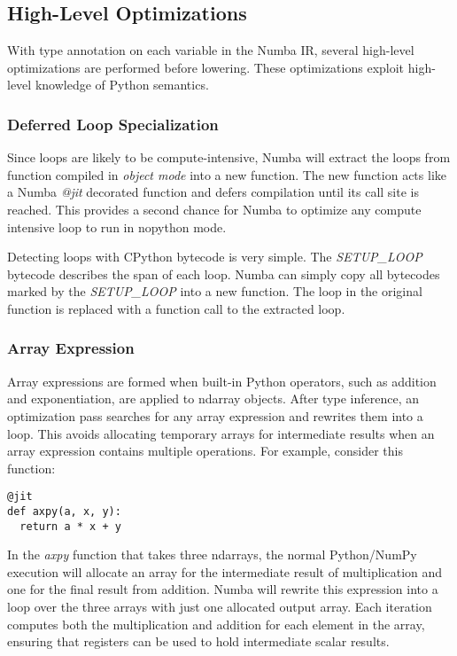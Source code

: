 \documentclass{sig-alternate}
\begin{document}
\subsection{High-Level Optimizations}

With type annotation on each variable in the Numba IR, several high-level
optimizations are performed before lowering. These optimizations exploit
high-level knowledge of Python semantics.

\subsubsection{Deferred Loop Specialization}

Since loops are likely to be compute-intensive, Numba will extract the
loops from function compiled in \textit{object mode} into a new
function.  The new function acts like a Numba \textit{@jit} decorated
function and defers compilation until its call site is reached. This
provides a second chance for Numba to optimize any compute intensive
loop to run in nopython mode.

Detecting loops with CPython bytecode is very simple. The
\textit{SETUP\_LOOP} bytecode describes the span of each loop. Numba
can simply copy all bytecodes marked by the \textit{SETUP\-\_LOOP} into
a new function. The loop in the original function is replaced with a
function call to the extracted loop.

\subsubsection{Array Expression}

Array expressions are formed when built-in Python operators, such as
addition and exponentiation, are applied to ndarray objects. After
type inference, an optimization pass searches for any array expression
and rewrites them into a loop. This avoids allocating temporary arrays
for intermediate results when an array expression contains multiple
operations.  For example, consider this function:

\begin{lstlisting}
@jit
def axpy(a, x, y):
  return a * x + y
\end{lstlisting}

In the \textit{axpy} function that takes three ndarrays, the normal
Python/NumPy execution will allocate an array for the intermediate
result of multiplication and one for the final result from
addition. Numba will rewrite this expression into a loop over the
three arrays with just one allocated output array.  Each iteration
computes both the multiplication and addition for each element in the
array, ensuring that registers can be used to hold intermediate scalar
results.
\end{document}
